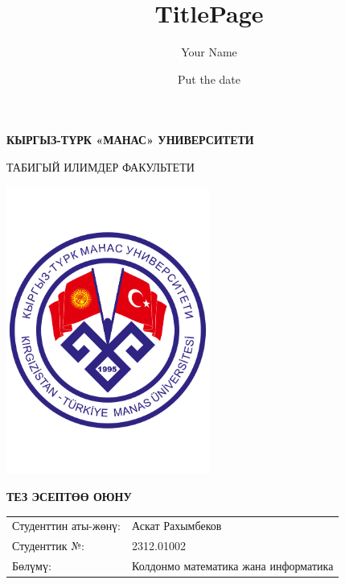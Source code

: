 \documentclass{article}
\title{TitlePage}
\author{Your Name}
\date{Put the date}
\begin{document}
\begin{titlepage}
    \begin{center}
            
        \Huge
        \textbf{КЫРГЫЗ-ТҮРК «МАНАС» УНИВЕРСИТЕТИ}
            
        \vspace{0.5cm}
        \LARGE
            ТАБИГЫЙ ИЛИМДЕР ФАКУЛЬТЕТИ
        
        \large
            
        \vspace{1cm}
         
        \includegraphics[width=0.5\textwidth]{Manas_logo.pdf}   
       
        
            
        \vspace{0.5cm}
            
        \Huge
            \textbf{ТЕЗ ЭСЕПТӨӨ ОЮНУ}
            
        \vspace{2cm}
            
        
     \end{center}  
     
\raggedright

\begin{tabular}{@{}l l@{}}
    \Large Студенттин аты-жөнү: & \Large Аскат Рахымбеков \\[1em]
    \Large Студенттик №: & \Large 2312.01002 \\[1em]
    \Large Бөлүмү: & \Large Колдонмо математика жана информатика \\
\end{tabular}

\Large
\Large
    
\end{titlepage}
\end{document}
